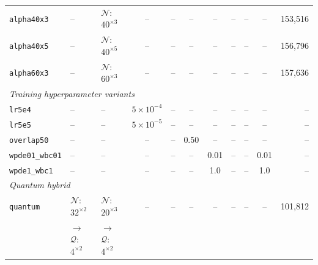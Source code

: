 \documentclass[11pt,a4paper]{article}
\begin{document}
\begin{table}[H]
{\begin{tabular}{l l l c c c c c c c r}
\texttt{alpha40x3} & -- & $\mathcal{N}$: $40^{\times3}$ & -- & -- & -- & -- & -- & -- & -- & 153{,}516 \\
\texttt{alpha40x5} & -- & $\mathcal{N}$: $40^{\times5}$ & -- & -- & -- & -- & -- & -- & -- & 156{,}796 \\
\texttt{alpha60x3} & -- & $\mathcal{N}$: $60^{\times3}$ & -- & -- & -- & -- & -- & -- & -- & 157{,}636 \\
\midrule
\multicolumn{11}{l}{\emph{Training hyperparameter variants}} \\
\texttt{lr5e4} & -- & -- & $5\!\times\!10^{-4}$ & -- & -- & -- & -- & -- & -- & -- \\
\texttt{lr5e5} & -- & -- & $5\!\times\!10^{-5}$ & -- & -- & -- & -- & -- & -- & -- \\
\texttt{overlap50} & -- & -- & -- & -- & 0.50 & -- & -- & -- & -- & -- \\
\texttt{wpde01\_wbc01} & -- & -- & -- & -- & -- & 0.01 & -- & -- & 0.01 & -- \\
\texttt{wpde1\_wbc1} & -- & -- & -- & -- & -- & 1.0 & -- & -- & 1.0 & -- \\
\midrule
\multicolumn{11}{l}{\emph{Quantum hybrid}} \\
\texttt{quantum} & $\mathcal{N}$: $32^{\times2}$ & $\mathcal{N}$: $20^{\times3}$ & -- & -- & -- & -- & -- & -- & -- & 101{,}812 \\
 & $\to$ $\mathcal{Q}$: $4^{\times2}$ & $\to$ $\mathcal{Q}$: $4^{\times2}$ & & & & & & & & \\
\bottomrule
\end{tabular}%
}
\end{table}
\end{document}
